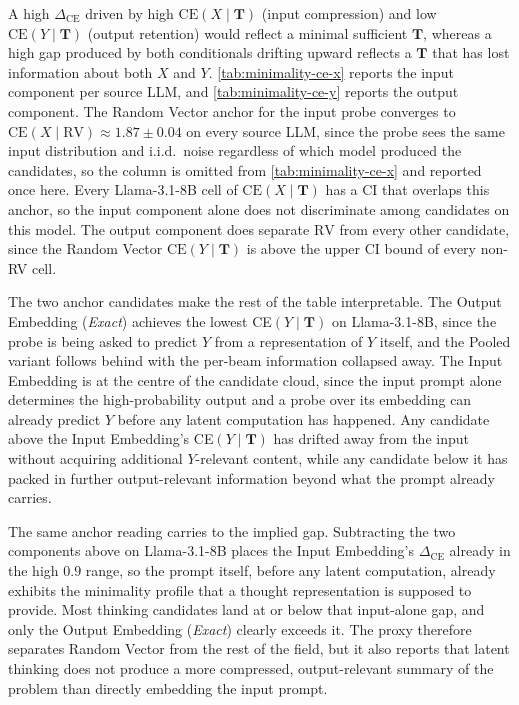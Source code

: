 A high $\Delta_{\text{CE}}$ driven by high $\text{CE}(X \mid \mathbf{T})$ (input compression) and low $\text{CE}(Y \mid \mathbf{T})$ (output retention) would reflect a minimal sufficient $\mathbf{T}$, whereas a high gap produced by both conditionals drifting upward reflects a $\mathbf{T}$ that has lost information about both $X$ and $Y$. \cref{tab:minimality-ce-x} reports the input component per source LLM, and \cref{tab:minimality-ce-y} reports the output component. The Random Vector anchor for the input probe converges to $\text{CE}(X \mid \mathrm{RV}) \approx 1.87 \pm 0.04$ on every source LLM, since the probe sees the same input distribution and i.i.d.\ noise regardless of which model produced the candidates, so the column is omitted from \cref{tab:minimality-ce-x} and reported once here. Every Llama-3.1-8B cell of $\text{CE}(X \mid \mathbf{T})$ has a CI that overlaps this anchor, so the input component alone does not discriminate among candidates on this model. The output component does separate $\mathrm{RV}$ from every other candidate, since the Random Vector $\text{CE}(Y \mid \mathbf{T})$ is above the upper CI bound of every non-RV cell.

The two anchor candidates make the rest of the table interpretable. The Output Embedding (\emph{Exact}) achieves the lowest CE$(Y \mid \mathbf{T})$ on Llama-3.1-8B, since the probe is being asked to predict $Y$ from a representation of $Y$ itself, and the Pooled variant follows behind with the per-beam information collapsed away. The Input Embedding is at the centre of the candidate cloud, since the input prompt alone determines the high-probability output and a probe over its embedding can already predict $Y$ before any latent computation has happened. Any candidate above the Input Embedding's CE$(Y \mid \mathbf{T})$ has drifted away from the input without acquiring additional $Y$-relevant content, while any candidate below it has packed in further output-relevant information beyond what the prompt already carries.

The same anchor reading carries to the implied gap. Subtracting the two components above on Llama-3.1-8B places the Input Embedding's $\Delta_{\text{CE}}$ already in the high $0.9$ range, so the prompt itself, before any latent computation, already exhibits the minimality profile that a thought representation is supposed to provide. Most thinking candidates land at or below that input-alone gap, and only the Output Embedding (\emph{Exact}) clearly exceeds it. The proxy therefore separates Random Vector from the rest of the field, but it also reports that latent thinking does not produce a more compressed, output-relevant summary of the problem than directly embedding the input prompt.

